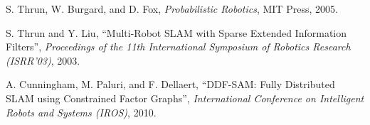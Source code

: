 \documentclass[11pt]{article}
\begin{document}
\begin{thebibliography}{12}
        S. Thrun, W. Burgard, and D. Fox, \emph{Probabilistic Robotics}, MIT Press, 2005.

        S. Thrun and Y. Liu, ``Multi-Robot SLAM with Sparse Extended Information Filters'', \emph{Proceedings of the 11th International Symposium of Robotics Research (ISRR'03)}, 2003.

        A. Cunningham, M. Paluri, and F. Dellaert, ``DDF-SAM: Fully Distributed SLAM using Constrained Factor Graphs'', \emph{International Conference on Intelligent Robots and Systems (IROS)}, 2010.

\end{thebibliography}
\end{document}
